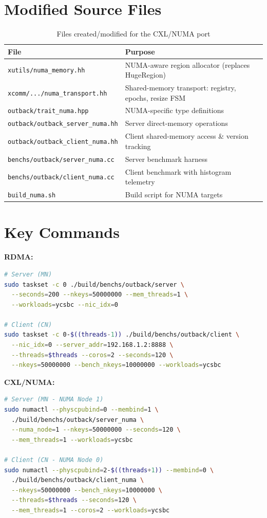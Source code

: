 \documentclass[11pt,a4paper]{article}
\begin{document}
\section{Modified Source Files}

\begin{table}[H]
\centering
\caption{Files created/modified for the CXL/NUMA port}
\label{tab:files}
\small
\begin{tabular}{@{}lp{8cm}@{}}
\toprule
\textbf{File} & \textbf{Purpose} \\
\midrule
\texttt{xutils/numa\_memory.hh} & NUMA-aware region allocator (replaces HugeRegion) \\
\texttt{xcomm/.../numa\_transport.hh} & Shared-memory transport: registry, epochs, resize FSM \\
\texttt{outback/trait\_numa.hpp} & NUMA-specific type definitions \\
\texttt{outback/outback\_server\_numa.hh} & Server direct-memory operations \\
\texttt{outback/outback\_client\_numa.hh} & Client shared-memory access \& version tracking \\
\texttt{benchs/outback/server\_numa.cc} & Server benchmark harness \\
\texttt{benchs/outback/client\_numa.cc} & Client benchmark with histogram telemetry \\
\texttt{build\_numa.sh} & Build script for NUMA targets \\
\bottomrule
\end{tabular}
\end{table}

\section{Key Commands}

\textbf{RDMA:}
\begin{lstlisting}[language=bash]
# Server (MN)
sudo taskset -c 0 ./build/benchs/outback/server \
  --seconds=200 --nkeys=50000000 --mem_threads=1 \
  --workloads=ycsbc --nic_idx=0

# Client (CN)
sudo taskset -c 0-$((threads-1)) ./build/benchs/outback/client \
  --nic_idx=0 --server_addr=192.168.1.2:8888 \
  --threads=$threads --coros=2 --seconds=120 \
  --nkeys=50000000 --bench_nkeys=10000000 --workloads=ycsbc
\end{lstlisting}

\textbf{CXL/NUMA:}
\begin{lstlisting}[language=bash]
# Server (MN - NUMA Node 1)
sudo numactl --physcpubind=0 --membind=1 \
  ./build/benchs/outback/server_numa \
  --numa_node=1 --nkeys=50000000 --seconds=120 \
  --mem_threads=1 --workloads=ycsbc

# Client (CN - NUMA Node 0)
sudo numactl --physcpubind=2-$((threads+1)) --membind=0 \
  ./build/benchs/outback/client_numa \
  --nkeys=50000000 --bench_nkeys=10000000 \
  --threads=$threads --seconds=120 \
  --mem_threads=1 --coros=2 --workloads=ycsbc
\end{lstlisting}
\end{document}
